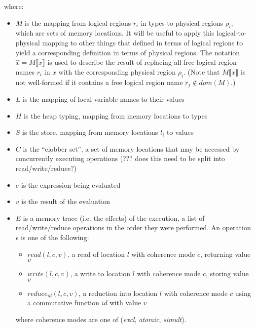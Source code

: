 where: 
\begin{itemize}
\item $M$ is the mapping from logical regions $r_i$ in types to physical regions $\rho_i$, which are sets of memory locations.  It will be useful to apply this logical-to-physical mapping to other
things that defined in terms of logical regions to yield a corresponding definition in terms of
physical regions.  The notation $\hat x = M \llbracket x \rrbracket$ is used to describe the
result of replacing all free logical region names $r_i$ in $x$ with the corresponding physical
region $\rho_i$.  (Note that $M \llbracket x \rrbracket$ is not
well-formed if it contains a free logical region name $r_j \not\in dom(M)$.)
\item $L$ is the mapping of local variable names to their values
\item $H$ is the heap typing, mapping from memory locations to types
\item $S$ is the store, mapping from memory locations $l_i$ to values
\item $C$ is the ``clobber set'', a set of memory locations that may be accessed by concurrently executing operations (??? does this need to be split into read/write/reduce?)
\item $e$ is the expression being evaluated
\item $v$ is the result of the evaluation
\item $E$ is a memory trace (i.e. the effects) of the execution, a list of read/write/reduce operations in the order they were performed.  An operation $\epsilon$ is one of the following:
\begin{itemize}
\item $read(l, c, v)$, a read of location $l$ with coherence mode $c$, returning value $v$
\item $write(l, c, v)$, a write to location $l$ with coherence mode $c$, storing value $v$
\item $reduce_{id}(l, c, v)$, a reduction into location $l$ with coherence mode $c$ using a
commutative function $id$ with value $v$
\end{itemize}
where coherence modes are one of ({\em excl}, {\em atomic}, {\em simult}).


\end{itemize}
